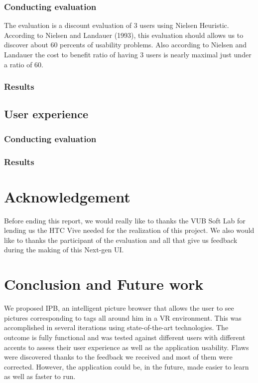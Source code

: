 \documentclass[11pt,a4paper]{article}
\begin{document}
\subsubsection{Conducting evaluation}

The evaluation is a discount evaluation of 3 users using Nielsen Heuristic. According to Nielsen and Landauer (1993), this evaluation should allows us to discover about 60 percents of usability problems. Also according to Nielsen and Landauer the cost to benefit ratio of having 3 users is nearly maximal just under a ratio of 60.


\subsubsection{Results}

\subsection{User experience}


\subsubsection{Conducting evaluation}

\subsubsection{Results}



\section{Acknowledgement}

Before ending this report, we would really like to thanks the VUB Soft Lab for lending us the HTC Vive needed for the realization of this project.
We also would like to thanks the participant of the evaluation and all that give us feedback during the making of this Next-gen UI.

\section{Conclusion and Future work}
We proposed IPB, an intelligent picture browser that allows the user to see pictures corresponding to tags all around him in a VR environment. This was accomplished in several iterations using state-of-the-art technologies. The outcome is fully functional and was tested against different users with different accents to assess their user experience as well as the application usability. Flaws were discovered thanks to the feedback we received and most of them were corrected. However, the application could be, in the future, made easier to learn as well as faster to run.
\end{document}
